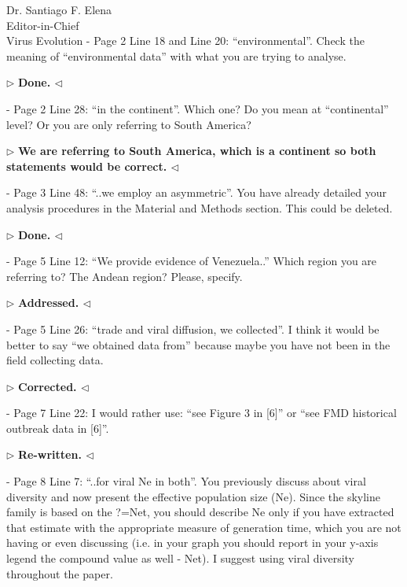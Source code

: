 \documentclass[12pt, a4paper]{letter} %
\newenvironment{reply}{$\triangleright$\bf}{$\triangleleft$}
\begin{document}
\begin{letter}{
	Dr. Santiago F. Elena\\
    Editor-in-Chief \\
    Virus Evolution
}
-       Page 2 Line 18 and Line 20: ``environmental''. 
Check the meaning of ``environmental data'' with what you are trying to analyse.

\begin{reply}
Done.
\end{reply}

-       Page 2 Line 28: ``in the continent''. 
Which one? 
Do you mean at ``continental'' level? 
Or you are only referring to South America?

\begin{reply}
We are referring to South America, which is a continent so both statements would be correct.
\end{reply}

-       Page 3 Line 48: ``..we employ an asymmetric''. 
You have already detailed your analysis procedures in the Material and Methods section. 
This could be deleted.

\begin{reply}
Done.
\end{reply}

-       Page 5 Line 12: ``We provide evidence of Venezuela..'' 
Which region you are referring to? 
The Andean region? 
Please, specify.

\begin{reply}
Addressed.
\end{reply}

-       Page 5 Line 26: ``trade and viral diffusion, we collected''. 
I think it would be better to say ``we obtained data from'' because maybe you have not been in the field collecting data.

\begin{reply}
Corrected. %
\end{reply}

-       Page 7 Line 22: I would rather use: ``see Figure 3 in [6]'' or ``see FMD historical outbreak data in [6]''.

\begin{reply}
Re-written.
\end{reply}

-       Page 8 Line 7: ``..for viral Ne in both''. 
You previously discuss about viral diversity and now present the effective population size (Ne). 
Since the skyline family is based on the ?=Net, you should describe Ne only if you have extracted that estimate with the appropriate measure of generation time, which you are not having or even discussing (i.e. in your graph you should report in your y-axis legend the compound value as well - Net). 
I suggest using viral diversity throughout the paper.


\end{letter}
\end{document}
